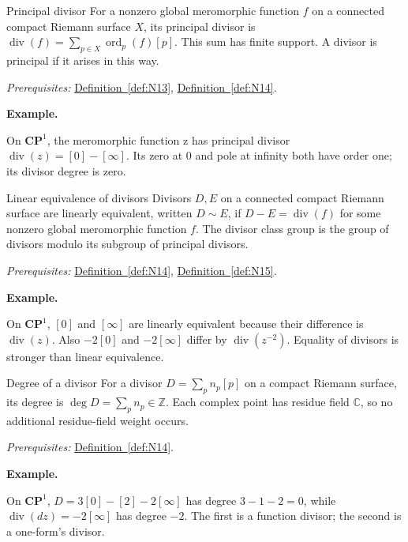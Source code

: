 \documentclass[11pt]{article}
\makeatletter
\newcommand{\C}{\mathbb C}
\newcounter{definition}
\newcommand{\CP}{\mathbf{CP}}
\newcommand{\Z}{\mathbb Z}
\newcommand{\exampleheading}{\par\medskip\textbf{Example.}\par\smallskip}
\newcommand{\currentdefinition}[1]{\protected@edef\@currentlabel{#1}}
\makeatother
\begin{document}
\begin{definitionbox}{Principal divisor}
\currentdefinition{\thedefinition}
\label{def:N15}
For a nonzero global meromorphic function $f$ on a connected compact Riemann surface $X$, its principal divisor is $\operatorname{div}(f)=\sum_{p\in X}\operatorname{ord}_p(f)[p]$. This sum has finite support. A divisor is principal if it arises in this way.

\smallskip
\textit{Prerequisites:} \hyperref[def:N13]{Definition~\ref*{def:N13}}, \hyperref[def:N14]{Definition~\ref*{def:N14}}.

\exampleheading
On $\CP^1$, the meromorphic function z has principal divisor $\operatorname{div}(z)=[0]-[\infty]$. Its zero at 0 and pole at infinity both have order one; its divisor degree is zero.
\end{definitionbox}

\begin{definitionbox}{Linear equivalence of divisors}
\currentdefinition{\thedefinition}
\label{def:N16}
Divisors $D,E$ on a connected compact Riemann surface are linearly equivalent, written $D\sim E$, if $D-E=\operatorname{div}(f)$ for some nonzero global meromorphic function $f$. The divisor class group is the group of divisors modulo its subgroup of principal divisors.

\smallskip
\textit{Prerequisites:} \hyperref[def:N14]{Definition~\ref*{def:N14}}, \hyperref[def:N15]{Definition~\ref*{def:N15}}.

\exampleheading
On $\CP^1$, $[0]$ and $[\infty]$ are linearly equivalent because their difference is $\operatorname{div}(z)$. Also $-2[0]$ and $-2[\infty]$ differ by $\operatorname{div}(z^{-2})$. Equality of divisors is stronger than linear equivalence.
\end{definitionbox}

\begin{definitionbox}{Degree of a divisor}
\currentdefinition{\thedefinition}
\label{def:N17}
For a divisor $D=\sum_p n_p[p]$ on a compact Riemann surface, its degree is $\deg D=\sum_p n_p\in\Z$. Each complex point has residue field $\C$, so no additional residue-field weight occurs.

\smallskip
\textit{Prerequisites:} \hyperref[def:N14]{Definition~\ref*{def:N14}}.

\exampleheading
On $\CP^1$, $D=3[0]-[2]-2[\infty]$ has degree $3-1-2=0$, while $\operatorname{div}(dz)=-2[\infty]$ has degree $-2$. The first is a function divisor; the second is a one-form's divisor.
\end{definitionbox}
\end{document}
